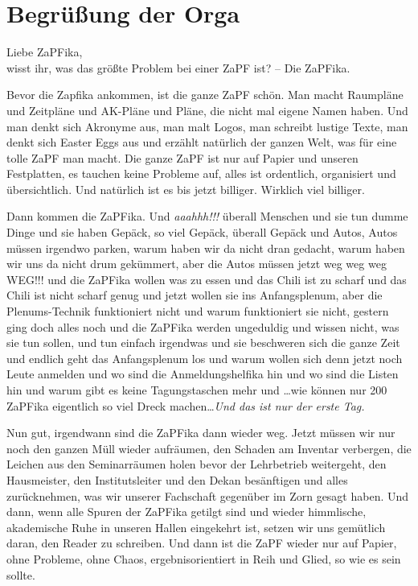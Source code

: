 
\section{Begrüßung der Orga}
Liebe ZaPFika,\\

\noindent wisst ihr, was das größte Problem bei einer ZaPF ist? -- Die ZaPFika.

Bevor die Zapfika ankommen, ist die ganze ZaPF schön. Man macht Raumpläne und Zeitpläne und AK-Pläne und Pläne, die nicht mal eigene Namen haben. Und man denkt sich Akronyme aus, man malt Logos, man schreibt lustige Texte, man denkt sich Easter Eggs aus und erzählt natürlich der ganzen Welt, was für eine tolle ZaPF man macht. Die ganze ZaPF ist nur auf Papier und unseren Festplatten, es tauchen keine Probleme auf, alles ist ordentlich, organisiert und übersichtlich. Und natürlich ist es bis jetzt billiger. Wirklich viel billiger.

Dann kommen die ZaPFika. Und \textit{aaahhh!!!} überall Menschen und sie tun dumme Dinge und sie haben Gepäck, so viel Gepäck, überall Gepäck und Autos, Autos müssen irgendwo parken, warum haben wir da nicht dran gedacht, warum haben wir uns da nicht drum gekümmert, aber die Autos müssen jetzt weg weg weg WEG!!! und die ZaPFika wollen was zu essen und das Chili ist zu scharf und das Chili ist nicht scharf genug und jetzt wollen sie ins Anfangsplenum, aber die Plenums-Technik funktioniert nicht und warum funktioniert sie nicht, gestern ging doch alles noch und die ZaPFika werden ungeduldig und wissen nicht, was sie tun sollen, und tun einfach irgendwas und sie beschweren sich die ganze Zeit und endlich geht das Anfangsplenum los und warum wollen sich denn jetzt noch Leute anmelden und wo sind die Anmeldungshelfika hin und wo sind die Listen hin und warum gibt es keine Tagungstaschen mehr und \dots wie können nur 200 ZaPFika eigentlich so viel Dreck machen\dots\textit{Und das ist nur der erste Tag.}

Nun gut, irgendwann sind die ZaPFika dann wieder weg. Jetzt müssen wir nur noch den ganzen Müll wieder aufräumen, den Schaden am Inventar verbergen, die Leichen aus den Seminarräumen holen bevor der Lehrbetrieb weitergeht, den Hausmeister, den Institutsleiter und den Dekan besänftigen und alles zurücknehmen, was wir unserer Fachschaft gegenüber im Zorn gesagt haben. Und dann, wenn alle Spuren der ZaPFika getilgt sind und wieder himmlische, akademische Ruhe in unseren Hallen eingekehrt ist, setzen wir uns gemütlich daran, den Reader zu schreiben. Und dann ist die ZaPF wieder nur auf Papier, ohne Probleme, ohne Chaos, ergebnisorientiert in Reih und Glied, so wie es sein sollte.

